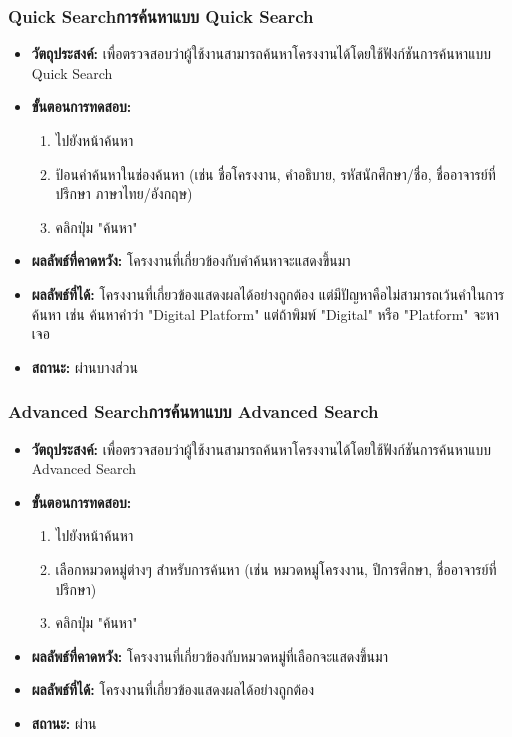 \subsubsection{\ifenglish Quick Search\else การค้นหาแบบ Quick Search\fi}
\begin{itemize}
  \item \textbf{วัตถุประสงค์:} เพื่อตรวจสอบว่าผู้ใช้งานสามารถค้นหาโครงงานได้โดยใช้ฟังก์ชันการค้นหาแบบ Quick Search
  \item \textbf{ขั้นตอนการทดสอบ:}
  \begin{enumerate}
    \item ไปยังหน้าค้นหา
    \item ป้อนคำค้นหาในช่องค้นหา (เช่น ชื่อโครงงาน, คำอธิบาย, รหัสนักศึกษา/ชื่อ, ชื่ออาจารย์ที่ปรึกษา ภาษาไทย/อังกฤษ)
    \item คลิกปุ่ม "ค้นหา"
  \end{enumerate}
  \item \textbf{ผลลัพธ์ที่คาดหวัง:} โครงงานที่เกี่ยวข้องกับคำค้นหาจะแสดงขึ้นมา
  \item \textbf{ผลลัพธ์ที่ได้:} โครงงานที่เกี่ยวข้องแสดงผลได้อย่างถูกต้อง แต่มีปัญหาคือไม่สามารถเว้นคำในการค้นหา เช่น ค้นหาคำว่า "Digital Platform" แต่ถ้าพิมพ์ "Digital" หรือ "Platform" จะหาเจอ
  \item \textbf{สถานะ:} ผ่านบางส่วน
\end{itemize}

\subsubsection{\ifenglish Advanced Search\else การค้นหาแบบ Advanced Search\fi}
\begin{itemize}
  \item \textbf{วัตถุประสงค์:} เพื่อตรวจสอบว่าผู้ใช้งานสามารถค้นหาโครงงานได้โดยใช้ฟังก์ชันการค้นหาแบบ Advanced Search
  \item \textbf{ขั้นตอนการทดสอบ:}
  \begin{enumerate}
    \item ไปยังหน้าค้นหา
    \item เลือกหมวดหมู่ต่างๆ สำหรับการค้นหา (เช่น หมวดหมู่โครงงาน, ปีการศึกษา, ชื่ออาจารย์ที่ปรึกษา)
    \item คลิกปุ่ม "ค้นหา"
  \end{enumerate}
  \item \textbf{ผลลัพธ์ที่คาดหวัง:} โครงงานที่เกี่ยวข้องกับหมวดหมู่ที่เลือกจะแสดงขึ้นมา
  \item \textbf{ผลลัพธ์ที่ได้:} โครงงานที่เกี่ยวข้องแสดงผลได้อย่างถูกต้อง
  \item \textbf{สถานะ:} ผ่าน
\end{itemize}

